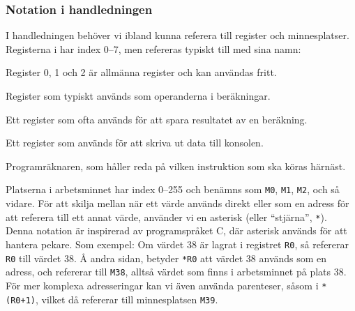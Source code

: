 \subsubsection{Notation i handledningen}
I handledningen behöver vi ibland kunna referera till register och minnesplatser. Registerna i \progname{} har index 0--7, men refereras typiskt till med sina namn:

\begin{description}[leftmargin=20mm]
    \item[\texttt{R0}--\texttt{R2}] Register 0, 1 och 2 är allmänna register och kan användas fritt.
    \item[\texttt{OP1}, \texttt{OP2}] Register som typiskt används som operanderna i beräkningar.
    \item[\texttt{RES}] Ett register som ofta används för att spara resultatet av en beräkning.
    \item[\texttt{OUT}] Ett register som används för att skriva ut data till konsolen.
    \item[\texttt{PC}] Programräknaren, som håller reda på vilken instruktion som ska köras härnäst.
\end{description}

Platserna i arbetsminnet har index 0--255 och benämns som \texttt{M0}, \texttt{M1}, \texttt{M2}, och så vidare. För att skilja mellan när ett värde används direkt eller som en adress för att referera till ett annat värde, använder vi en asterisk (eller ``stjärna'', \texttt{*}). Denna notation är inspirerad av programspråket C, där asterisk används för att hantera pekare. Som exempel: Om värdet 38 är lagrat i registret \texttt{R0}, så refererar \texttt{R0} till värdet 38. Å andra sidan, betyder \texttt{*R0} att värdet 38 används som en adress, och refererar till \texttt{M38}, alltså värdet som finns i arbetsminnet på plats 38. För mer komplexa adresseringar kan vi även använda parenteser, såsom i \texttt{*(R0+1)}, vilket då refererar till minnesplatsen \texttt{M39}.

\newpage

